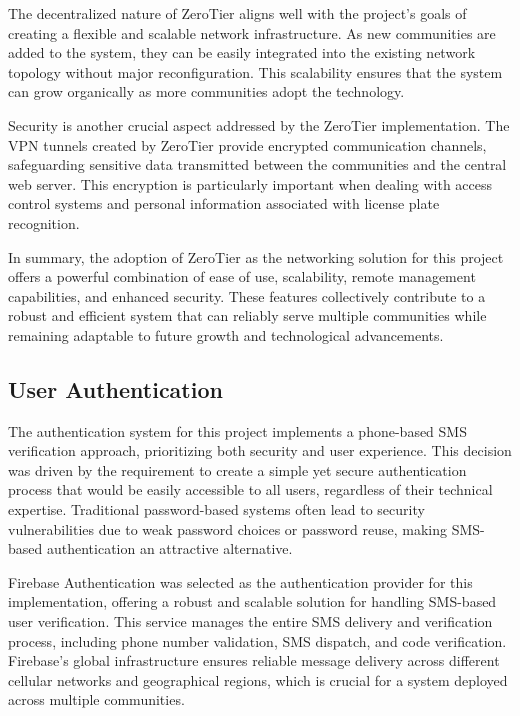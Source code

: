 The decentralized nature of ZeroTier aligns well with the project's goals of creating a flexible and scalable network infrastructure. As new communities are added to the system, they can be easily integrated into the existing network topology without major reconfiguration. This scalability ensures that the system can grow organically as more communities adopt the technology.

Security is another crucial aspect addressed by the ZeroTier implementation. The VPN tunnels created by ZeroTier provide encrypted communication channels, safeguarding sensitive data transmitted between the communities and the central web server. This encryption is particularly important when dealing with access control systems and personal information associated with license plate recognition.

In summary, the adoption of ZeroTier as the networking solution for this project offers a powerful combination of ease of use, scalability, remote management capabilities, and enhanced security. These features collectively contribute to a robust and efficient system that can reliably serve multiple communities while remaining adaptable to future growth and technological advancements.


\subsection{User Authentication}\label{sec:authentication}

The authentication system for this project implements a phone-based SMS verification approach, prioritizing both security and user experience. This decision was driven by the requirement to create a simple yet secure authentication process that would be easily accessible to all users, regardless of their technical expertise. Traditional password-based systems often lead to security vulnerabilities due to weak password choices or password reuse, making SMS-based authentication an attractive alternative.

Firebase Authentication was selected as the authentication provider for this implementation, offering a robust and scalable solution for handling SMS-based user verification. This service manages the entire SMS delivery and verification process, including phone number validation, SMS dispatch, and code verification. Firebase's global infrastructure ensures reliable message delivery across different cellular networks and geographical regions, which is crucial for a system deployed across multiple communities.

